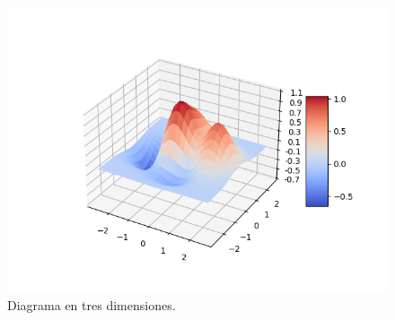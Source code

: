 \documentclass{article}
\begin{document}
\begin{figure}
    \centering
    \includegraphics[width=200mm]{Figure_1.png}
    \caption{Diagrama en tres dimensiones.}
    \label{figure}
\end{figure}
\newpage
\end{document}
